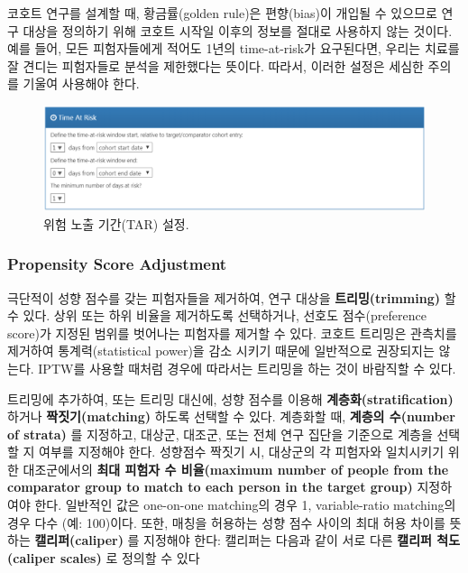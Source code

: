 \documentclass[11pt]{book}
\theoremstyle{definition}
\theoremstyle{definition}
\theoremstyle{definition}
\theoremstyle{remark}
\let\BeginKnitrBlock\begin \let\EndKnitrBlock\end
\begin{document}
\BeginKnitrBlock{rmdimportant}
코호트 연구를 설계할 때, 황금률(golden rule)은 편향(bias)이 개입될 수
있으므로 연구 대상을 정의하기 위해 코호트 시작일 이후의 정보를 절대로
사용하지 않는 것이다. 예를 들어, 모든 피험자들에게 적어도 1년의
time-at-risk가 요구된다면, 우리는 치료를 잘 견디는 피험자들로 분석을
제한했다는 뜻이다. 따라서, 이러한 설정은 세심한 주의를 기울여 사용해야
한다.
\EndKnitrBlock{rmdimportant}

\begin{figure}

{\centering \includegraphics[width=1\linewidth]{images/PopulationLevelEstimation/timeAtRisk} 

}

\caption{위험 노출 기간(TAR) 설정.}\label{fig:timeAtRisk}
\end{figure}

\subsubsection*{Propensity Score
Adjustment}\label{propensity-score-adjustment}

극단적이 성향 점수를 갖는 피험자들을 제거하여, 연구 대상을
\textbf{트리밍(trimming)} 할 수 있다. 상위 또는 하위 비율을 제거하도록
선택하거나, 선호도 점수(preference score)가 지정된 범위를 벗어나는
피험자를 제거할 수 있다. 코호트 트리밍은 관측치를 제거하여
통계력(statistical power)을 감소 시키기 때문에 일반적으로 권장되지는
않는다. IPTW를 사용할 때처럼 경우에 따라서는 트리밍을 하는 것이 바람직할
수 있다. 

트리밍에 추가하여, 또는 트리밍 대신에, 성향 점수를 이용해
\textbf{계층화(stratification)} 하거나 \textbf{짝짓기(matching)} 하도록
선택할 수 있다. 계층화할 때, \textbf{계층의 수(number of strata)} 를
지정하고, 대상군, 대조군, 또는 전체 연구 집단을 기준으로 계층을 선택할
지 여부를 지정해야 한다. 성향점수 짝짓기 시, 대상군의 각 피험자와
일치시키기 위한 대조군에서의 \textbf{최대 피험자 수 비율(maximum number
of people from the comparator group to match to each person in the
target group)} 지정하여야 한다. 일반적인 값은 one-on-one matching의 경우
1, variable-ratio matching의 경우 다수 (예: 100)이다. 또한, 매칭을
허용하는 성향 점수 사이의 최대 허용 차이를 뜻하는
\textbf{캘리퍼(caliper)} 를 지정해야 한다: 캘리퍼는 다음과 같이 서로
다른 \textbf{캘리퍼 척도(caliper scales)} 로 정의할 수 있다
\end{document}
